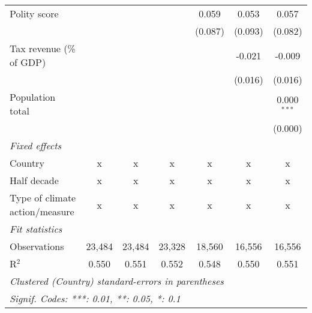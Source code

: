 \begin{tabular}{lcccccc}
   Polity score                                                               &         &               &               & 0.059         & 0.053         & 0.057\\   
                                                                              &         &               &               & (0.087)       & (0.093)       & (0.082)\\   
   Tax revenue (\% of GDP)                                                    &         &               &               &               & -0.021        & -0.009\\   
                                                                              &         &               &               &               & (0.016)       & (0.016)\\   
   Population total                                                           &         &               &               &               &               & 0.000$^{***}$\\   
                                                                              &         &               &               &               &               & (0.000)\\   
   \emph{Fixed effects}\\
   Country                                                                    & x       & x             & x             & x             & x             & x\\  
   Half decade                                                                & x       & x             & x             & x             & x             & x\\  
   Type of climate action/measure                                             & x       & x             & x             & x             & x             & x\\  
   \midrule \emph{Fit statistics}\\
   Observations                                                               & 23,484  & 23,484        & 23,328        & 18,560        & 16,556        & 16,556\\  
   R$^2$                                                                      & 0.550   & 0.551         & 0.552         & 0.548         & 0.550         & 0.551\\  
   \midrule
   \multicolumn{7}{l}{\emph{Clustered (Country) standard-errors in parentheses}}\\
   \multicolumn{7}{l}{\emph{Signif. Codes: ***: 0.01, **: 0.05, *: 0.1}}\\
\end{tabular}
\par\endgroup


